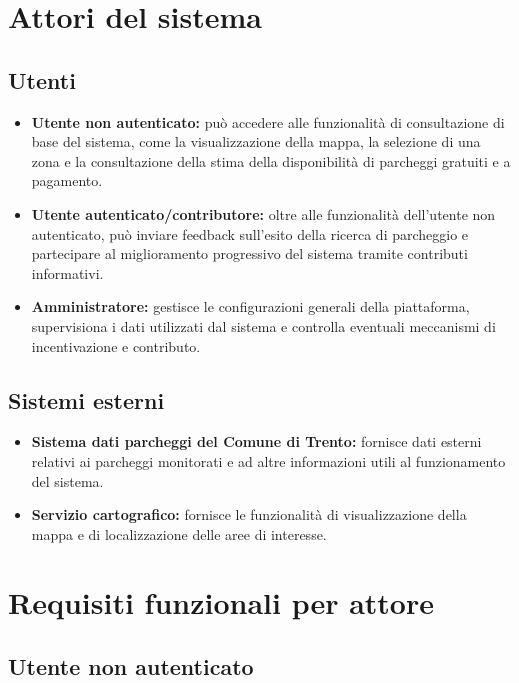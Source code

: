 \documentclass[a4paper,12pt]{article}
\begin{document}
\section{Attori del sistema}

\subsection{Utenti}

\begin{itemize}
    \item \textbf{Utente non autenticato:} può accedere alle funzionalità di consultazione di base del sistema, come la visualizzazione della mappa, la selezione di una zona e la consultazione della stima della disponibilità di parcheggi gratuiti e a pagamento.

    \item \textbf{Utente autenticato/contributore:} oltre alle funzionalità dell'utente non autenticato, può inviare feedback sull'esito della ricerca di parcheggio e partecipare al miglioramento progressivo del sistema tramite contributi informativi.

    \item \textbf{Amministratore:} gestisce le configurazioni generali della piattaforma, supervisiona i dati utilizzati dal sistema e controlla eventuali meccanismi di incentivazione e contributo.
\end{itemize}

\subsection{Sistemi esterni}

\begin{itemize}
    \item \textbf{Sistema dati parcheggi del Comune di Trento:} fornisce dati esterni relativi ai parcheggi monitorati e ad altre informazioni utili al funzionamento del sistema.

    \item \textbf{Servizio cartografico:} fornisce le funzionalità di visualizzazione della mappa e di localizzazione delle aree di interesse.
\end{itemize}
\section{Requisiti funzionali per attore}

\subsection{Utente non autenticato}
\end{document}

